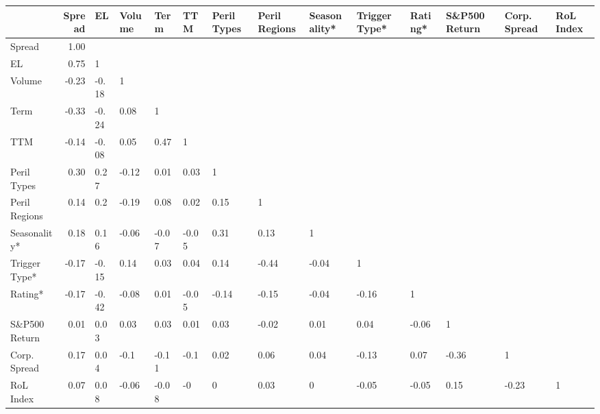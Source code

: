 \begin{tabular}{lrllllllllllll}
\toprule
{} &  Spread &    EL & Volume &  Term &   TTM & Peril Types & Peril Regions & Seasonality* & Trigger Type* & Rating* & S\&P500 Return & Corp. Spread & RoL Index \\
\midrule
Spread        &    1.00 &       &        &       &       &             &               &              &               &         &               &              &           \\
EL            &    0.75 &     1 &        &       &       &             &               &              &               &         &               &              &           \\
Volume        &   -0.23 & -0.18 &      1 &       &       &             &               &              &               &         &               &              &           \\
Term          &   -0.33 & -0.24 &   0.08 &     1 &       &             &               &              &               &         &               &              &           \\
TTM           &   -0.14 & -0.08 &   0.05 &  0.47 &     1 &             &               &              &               &         &               &              &           \\
Peril Types   &    0.30 &  0.27 &  -0.12 &  0.01 &  0.03 &           1 &               &              &               &         &               &              &           \\
Peril Regions &    0.14 &   0.2 &  -0.19 &  0.08 &  0.02 &        0.15 &             1 &              &               &         &               &              &           \\
Seasonality*  &    0.18 &  0.16 &  -0.06 & -0.07 & -0.05 &        0.31 &          0.13 &            1 &               &         &               &              &           \\
Trigger Type* &   -0.17 & -0.15 &   0.14 &  0.03 &  0.04 &        0.14 &         -0.44 &        -0.04 &             1 &         &               &              &           \\
Rating*       &   -0.17 & -0.42 &  -0.08 &  0.01 & -0.05 &       -0.14 &         -0.15 &        -0.04 &         -0.16 &       1 &               &              &           \\
S\&P500 Return &    0.01 &  0.03 &   0.03 &  0.03 &  0.01 &        0.03 &         -0.02 &         0.01 &          0.04 &   -0.06 &             1 &              &           \\
Corp. Spread  &    0.17 &  0.04 &   -0.1 & -0.11 &  -0.1 &        0.02 &          0.06 &         0.04 &         -0.13 &    0.07 &         -0.36 &            1 &           \\
RoL Index     &    0.07 &  0.08 &  -0.06 & -0.08 &    -0 &           0 &          0.03 &            0 &         -0.05 &   -0.05 &          0.15 &        -0.23 &         1 \\
\bottomrule
\end{tabular}
